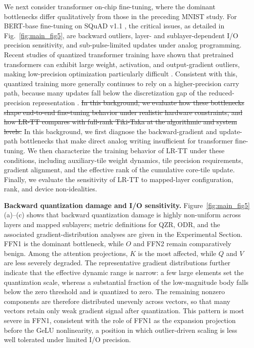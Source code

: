 \documentclass[AMA,LATO2COL]{WileyNJDv5}
\newcommand{\old}[1]{\sout{#1}}
\newcommand{\new}[1]{{\color{red}#1}}
\begin{document}
\noindent
We next consider transformer on-chip fine-tuning, where the dominant bottlenecks differ qualitatively from those in the preceding MNIST study. For BERT-base \cite{devlin-etal-2019-bert} fine-tuning on SQuAD v1.1 \cite{rajpurkar-etal-2016-squad}, the critical issues, as detailed in Fig.~\ref{fig:main_fig5}, are backward outliers, layer- and sublayer-dependent I/O precision sensitivity, and sub-pulse-limited updates under analog programming. Recent studies of quantized transformer training have shown that pretrained transformers can exhibit large weight, activation, and output-gradient outliers, making low-precision optimization particularly difficult \cite{ashkboos2025halo,bondarenko-etal-2021-understanding,xi2023training}. Consistent with this, quantized training more generally continues to rely on a higher-precision carry path, because many updates fall below the discretization gap of the reduced-precision representation \cite{nikdan2026eco}. \old{In this background, we evaluate how these bottlenecks shape end-to-end fine-tuning behavior under realistic hardware constraints, and how LR-TT compares with full-rank Tiki-Taka at the algorithmic and system levels.}
\new{In this background, we first diagnose the backward-gradient and update-path bottlenecks that make direct analog writing insufficient for transformer fine-tuning. We then characterize the training behavior of LR-TT under these conditions, including auxiliary-tile weight dynamics, tile precision requirements, gradient alignment, and the effective rank of the cumulative core-tile update. Finally, we evaluate the sensitivity of LR-TT to mapped-layer configuration, rank, and device non-idealities.}

\noindent\textbf{Backward quantization damage and I/O sensitivity.}
Figure~\ref{fig:main_fig5}(a)--(c) shows that backward quantization damage is highly non-uniform across layers and mapped sublayers; metric definitions for QZR, ODR, and the associated gradient-distribution analyses are given in the Experimental Section. FFN1 is the dominant bottleneck, while \(O\) and FFN2 remain comparatively benign. Among the attention projections, \(K\) is the most affected, while \(Q\) and \(V\) are less severely degraded. The representative gradient distributions further indicate that the effective dynamic range is narrow: a few large elements set the quantization scale, whereas a substantial fraction of the low-magnitude body falls below the zero threshold and is quantized to zero. The remaining nonzero components are therefore distributed unevenly across vectors, so that many vectors retain only weak gradient signal after quantization. This pattern is most severe in FFN1, consistent with the role of FFN1 as the expansion projection before the GeLU nonlinearity, a position in which outlier-driven scaling is less well tolerated under limited I/O precision.
\end{document}
